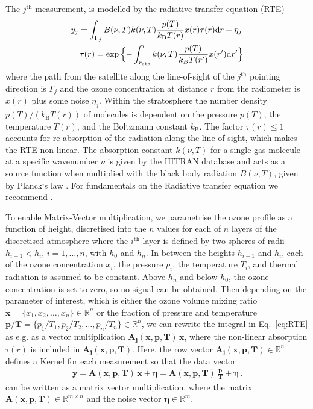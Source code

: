 The $j^\text{th}$ measurement, is modelled by the radiative transfer equation (RTE)~\cite{mipas2000handbook}
\begin{align}
	\label{eq:RTE} 
	y_j =   \int_{\Gamma_j}  B(\nu,T) k(\nu, T)   \frac{p(T)}{k_{\text{B}} T(r)}  x(r)  \tau(r) \text{d}r + \eta_j \, \\
	\tau(r) = \exp{ \Bigl\{ - \int^{r}_{r_\text{obs}}  k(\nu, T)   \frac{p(T)}{k_B T(r^{\prime})}  x(r^{\prime}) \text{d}r^{\prime} \Bigr\} }
\end{align}
where the path from the satellite along the line-of-sight of the $j^\text{th}$ pointing direction is $\Gamma_j$ and the ozone concentration at distance $r$ from the radiometer is $x(r)$ plus some noise $\eta_j$.
Within the stratosphere the number density $p(T) / (k_{\text{B}} T(r))$ of molecules is dependent on the pressure $p(T)$, the temperature $T(r)$, and the Boltzmann constant $k_{\text{B}}$.
The factor $\tau(r)\leq 1$ accounts for re-absorption of the radiation along the line-of-sight, which makes the RTE non linear.
The absorption constant $k(\nu, T)$ for a single gas molecule at a specific wavenumber $\nu$ is given by the HITRAN database \cite{gordon2022hitran2020} and acts as a source function when multiplied with the black body radiation $B(\nu,T)$, given by Planck`s law \cite{rybicki2000rte}.
For fundamentals on the Radiative transfer equation we recommend \cite[Chapter 1]{rybicki2000rte}.
 
To enable Matrix-Vector multiplication, we parametrise the ozone profile as a function of height, discretised into the $n$ values for each of $n$ layers of the discretised atmosphere where the $i^\text{th}$ layer is defined by two spheres of radii  $h_{i-1} < h_{i}$, $i = 1, \dots, n$, with $h_0$ and $h_{n} $.
In between the heights $h_{i-1}$ and $h_{i}$, each of the ozone concentration $x_{i}$, the pressure $p_{i}$, the temperature $T_{i}$, and thermal radiation is assumed to be constant.
Above $h_{n}$ and below $h_0$, the ozone concentration is set to zero, so no signal can be obtained.
Then depending on the parameter of interest, which is either the ozone volume mixing ratio $\bm{x} =\{x_1,x_2,\ldots,x_n\} \in \mathbb{R}^{n}$ or the fraction of pressure and temperature $\bm{p/T}= \{p_1/T_1,p_2/T_2,\ldots,p_n/T_n\} \in \mathbb{R}^{n} $, we can rewrite the integral in Eq.~\eqref{eq:RTE} as e.g. as a vector multiplication $\bm{A_{j}}(\bm{x},  \bm{p},\bm{T}) \, \bm{x} $, where the non-linear absorption $\tau(r)$ is included in $\bm{A_{j}}(\bm{x},  \bm{p},\bm{T})$.
Here, the row vector $\bm{A_{j}}(\bm{x},  \bm{p},\bm{T}) \in \mathbb{R}^{n}$  defines a Kernel for each measurement so that the data vector
\begin{align}
	\bm{y} = \bm{A}(\bm{x},  \bm{p},\bm{T}) \, \bm{x} + \bm{\eta}= \bm{A}(\bm{x},  \bm{p},\bm{T}) \,
	\frac{ \bm{p}}{\bm{T}} + \bm{\eta} \, .
\end{align}
can be written as a matrix vector multiplication, where the matrix $\bm{A}(\bm{x},  \bm{p},\bm{T}) \in \mathbb{R}^{m \times n}$ and the noise vector $\bm{\eta} \in \mathbb{R}^{m}$.

